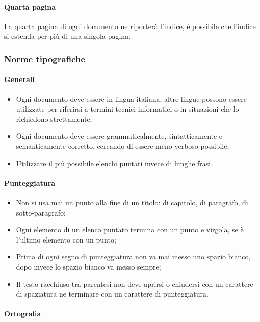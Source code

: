 \paragraph{Quarta pagina}
La quarta pagina di ogni documento ne riporterà l'indice, è possibile che l'indice si estenda per più di una singola pagina. 

\subsubsection{Norme tipografiche}
\paragraph{Generali}
\begin{itemize}
\item Ogni documento deve essere in lingua italiana, altre lingue possono essere utilizzate per riferirsi a termini tecnici informatici o in situazioni che lo richiedono strettamente;

\item Ogni documento deve essere grammaticalmente, sintatticamente e semanticamente corretto, cercando di essere meno verboso possibile;

\item Utilizzare il più possibile elenchi puntati invece di lunghe frasi.

\end{itemize}
\paragraph{Punteggiatura}
\begin{itemize}
\item Non si usa mai un punto alla fine di un titolo: di capitolo, di paragrafo, di sotto-paragrafo;

\item Ogni elemento di un elenco puntato termina con un punto e virgola, se è l'ultimo elemento con un punto;

\item Prima di ogni segno di punteggiatura non va mai messo uno spazio bianco, dopo invece lo spazio bianco va messo sempre;


\item Il testo racchiuso tra parentesi non deve aprirsi o chiudersi con un carattere di spaziatura ne terminare con un carattere di punteggiatura.

\end{itemize}
\paragraph{Ortografia}

